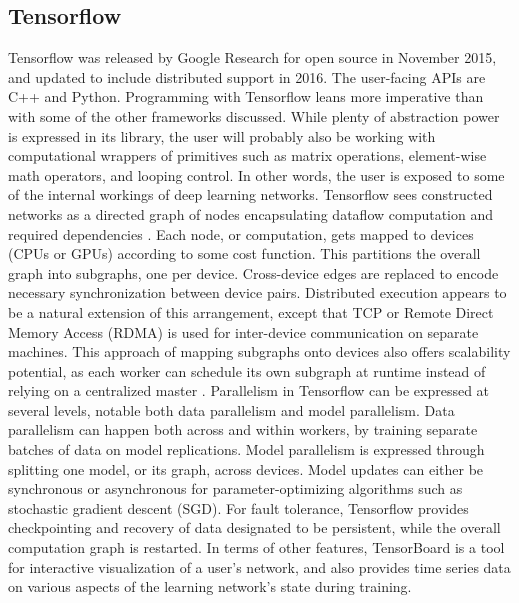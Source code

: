 \documentclass{article}
\begin{document}
\subsection{Tensorflow}
Tensorflow was released by Google Research for open source in November 2015, and updated to include distributed support in 2016. The user-facing APIs are C++ and Python. Programming with Tensorflow leans more imperative than with some of the other frameworks discussed. While plenty of abstraction power is expressed in its library, the user will probably also be working with computational wrappers of primitives such as matrix operations, element-wise math operators, and looping control. In other words, the user is exposed to some of the internal workings of deep learning networks. Tensorflow sees constructed networks as a directed graph of nodes encapsulating dataflow computation and required dependencies \cite{DBLP:journals/corr/AbadiABBCCCDDDG16}. Each node, or computation, gets mapped to devices (CPUs or GPUs) according to some cost function. This partitions the overall graph into subgraphs, one per device. Cross-device edges are replaced to encode necessary synchronization between device pairs. Distributed execution appears to be a natural extension of this arrangement, except that TCP or Remote Direct Memory Access (RDMA) is used for inter-device communication on separate machines. This approach of mapping subgraphs onto devices also offers scalability potential, as each worker can schedule its own subgraph at runtime instead of relying on a centralized master \cite{DBLP:journals/corr/AbadiABBCCCDDDG16}. Parallelism in Tensorflow can be expressed at several levels, notable both data parallelism and model parallelism. Data parallelism can happen both across and within workers, by training separate batches of data on model replications. Model parallelism is expressed through splitting one model, or its graph, across devices. Model updates can either be synchronous or asynchronous for parameter-optimizing algorithms such as stochastic gradient descent (SGD). For fault tolerance, Tensorflow provides checkpointing and recovery of data designated to be persistent, while the overall computation graph is restarted. In terms of other features, TensorBoard is a tool for interactive visualization of a user's network, and also provides time series data on various aspects of the learning network's state during training. 
\end{document}
